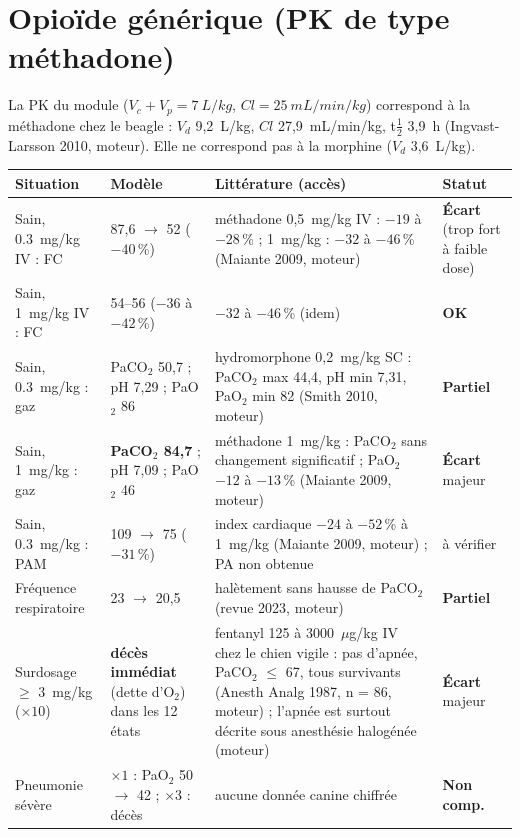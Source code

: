 \documentclass[10pt,a4paper]{article}
\newcommand{\ok}{\textcolor{green!45!black}{\textbf{OK}}}
\newcommand{\ecart}{\textcolor{red!70!black}{\textbf{Écart}}}
\newcommand{\partiel}{\textcolor{orange!80!black}{\textbf{Partiel}}}
\newcommand{\nc}{\textcolor{black!60}{\textbf{Non comp.}}}
\begin{document}
\section{Opioïde générique (PK de type méthadone)}

La PK du module ($V_c + V_p = \SI{7}{L/kg}$, $Cl = \SI{25}{mL/min/kg}$) correspond à la méthadone chez le beagle : $V_d$ 9,2~L/kg, $Cl$ 27,9~mL/min/kg, t$\frac12$ 3,9~h (Ingvast-Larsson 2010, moteur). Elle ne correspond pas à la morphine ($V_d$ 3,6~L/kg).

\begin{tabularx}{\linewidth}{@{}P{3.4cm}P{4.3cm}LP{1.8cm}@{}}
\toprule
Situation & Modèle & Littérature (accès) & Statut\\
\midrule\endhead
Sain, \SI{0,3}{mg/kg} IV : FC & 87,6 $\rightarrow$ 52 ($-40$\,\%) & méthadone 0,5~mg/kg IV : $-19$ à $-28$\,\% ; 1~mg/kg : $-32$ à $-46$\,\% (Maiante 2009, moteur) & \ecart{} (trop fort à faible dose)\\
Sain, \SI{1}{mg/kg} IV : FC & 54--56 ($-36$ à $-42$\,\%) & $-32$ à $-46$\,\% (idem) & \ok{}\\
Sain, \SI{0,3}{mg/kg} : gaz & PaCO$_2$ 50,7 ; pH 7,29 ; PaO$_2$ 86 & hydromorphone 0,2~mg/kg SC : PaCO$_2$ max 44,4, pH min 7,31, PaO$_2$ min 82 (Smith 2010, moteur) & \partiel{}\\
Sain, \SI{1}{mg/kg} : gaz & \textbf{PaCO$_2$ 84,7} ; pH 7,09 ; PaO$_2$ 46 & méthadone 1~mg/kg : PaCO$_2$ sans changement significatif ; PaO$_2$ $-12$ à $-13$\,\% (Maiante 2009, moteur) & \ecart{} majeur\\
Sain, \SI{0,3}{mg/kg} : PAM & 109 $\rightarrow$ 75 ($-31$\,\%) & index cardiaque $-24$ à $-52$\,\% à 1~mg/kg (Maiante 2009, moteur) ; PA non obtenue & à vérifier\\
Fréquence respiratoire & 23 $\rightarrow$ 20,5 & halètement sans hausse de PaCO$_2$ (revue 2023, moteur) & \partiel{}\\
Surdosage $\geq$ \SI{3}{mg/kg} ($\times 10$) & \textbf{décès immédiat} (dette d'O$_2$) dans les 12 états & fentanyl 125 à 3000~$\mu$g/kg IV chez le chien vigile : pas d'apnée, PaCO$_2$ $\leq$ 67, tous survivants (Anesth Analg 1987, n = 86, moteur) ; l'apnée est surtout décrite sous anesthésie halogénée (moteur) & \ecart{} majeur\\
Pneumonie sévère & $\times 1$ : PaO$_2$ 50 $\rightarrow$ 42 ; $\times 3$ : décès & aucune donnée canine chiffrée & \nc{}\\
\bottomrule
\end{tabularx}
\end{document}
